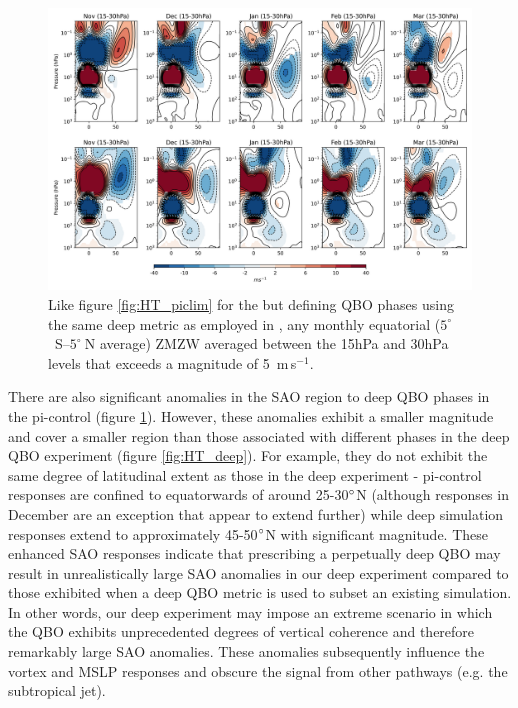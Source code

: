 \begin{figure}[h!]
\begin{center}
\noindent\includegraphics[width = \linewidth]{Figures/Figures-deepQBO/ZMZW_composites_by_month_QBO_phases_U_picontrol_MarQBO_vs_Mar_deep2hPa_5thresh.png}
\caption[ZMZW composites under different QBO phases in the pi-control simulation]{Like figure \ref{fig:HT_piclim} for the but defining QBO phases using the same deep metric as employed in \cite{andrewsObserved2019d}, any monthly equatorial ($5^{\circ}$\ S--$5^{\circ}\ $N average) ZMZW averaged between the 15hPa and 30hPa levels that exceeds a magnitude of 5\ m\,s$^{-1}$.}
\label{fig:HT_picontrol}
\end{center}
\end{figure}

There are also significant anomalies in the SAO region to deep QBO phases in the pi-control (figure \ref{fig:HT_picontrol}). However, these anomalies exhibit a smaller magnitude and cover a smaller region than those associated with different phases in the deep QBO experiment (figure \ref{fig:HT_deep}). For example, they do not exhibit the same degree of latitudinal extent as those in the deep experiment - pi-control responses are confined to equatorwards of around 25-30$\degree$N (although responses in December are an exception that appear to extend further) while deep simulation responses extend to approximately 45-50$\degree$N with significant magnitude. These enhanced SAO responses indicate that prescribing a perpetually deep QBO may result in unrealistically large SAO anomalies in our deep experiment compared to those exhibited when a deep QBO metric is used to subset an existing simulation. In other words, our deep experiment may impose an extreme scenario in which the QBO exhibits unprecedented degrees of vertical coherence and therefore remarkably large SAO anomalies. These anomalies subsequently influence the vortex and MSLP responses and obscure the signal from other pathways (e.g. the subtropical jet).


